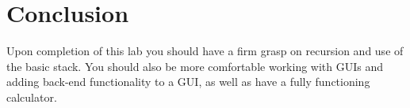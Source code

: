 \section{Conclusion}

Upon completion of this lab you should have a firm grasp on recursion and use of the basic stack.  You should also be more comfortable working with GUIs and adding back-end functionality to a GUI, as well as have a fully functioning calculator.